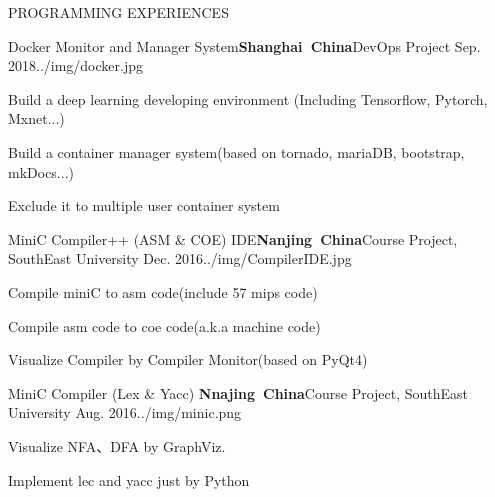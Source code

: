 \documentclass{resume} %
\begin{document}
\begin{rSection}{PROGRAMMING EXPERIENCES}

\begin{rSubsection}{Docker Monitor and Manager System}{\bf Shanghai\ China}{DevOps Project  \href{https://github.com/piaozhx/DockerMonitor}{{\color{blue}{[Github]}}}    }{Sep. 2018}{../img/docker.jpg}
    \item Build a deep learning developing environment (Including Tensorflow, Pytorch, Mxnet...)
    \item Build a container manager system(based on tornado, mariaDB, bootstrap, mkDocs...)
    \item Exclude it to multiple user container system
\end{rSubsection}

\begin{rSubsection}{MiniC Compiler++ (ASM \& COE) IDE}{\bf Nanjing\ China}{Course Project, SouthEast University   \href{https://github.com/piaozhx/CompilerIDE}{{\color{blue}{[Github]}}}     }{Dec. 2016}{../img/CompilerIDE.jpg}
    \item Compile miniC to asm code(include 57 mips code)
    \item Compile asm code to coe code(a.k.a machine code)
    \item Visualize Compiler by Compiler Monitor(based on PyQt4)
\end{rSubsection}


\begin{rSubsection}{MiniC Compiler (Lex \& Yacc) }{\bf Nnajing\ China}{Course Project, SouthEast University  \href{https://github.com/seucs/compiler}{{\color{blue}{[Github]}}}    }{Aug. 2016}{../img/minic.png}
    \item Visualize NFA、DFA by GraphViz.
    \item Implement lec and yacc just by Python
\end{rSubsection}
    
\end{rSection}
\end{document}
